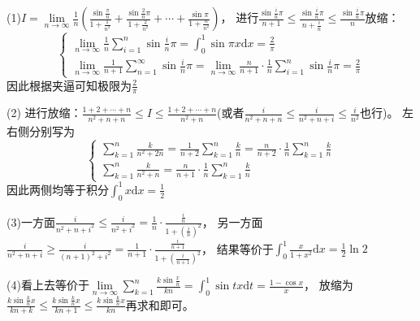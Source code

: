 \begin{solution}
  (1)$I = \lim \limits _{n \rightarrow \infty} \frac{1}{n} \left( \frac{\sin \frac{\pi}{n}}{1 + \frac{1}{n^2}} + \frac{\sin \frac{2}{n}\pi}{1 + \frac{2}{n^2}} + \cdots + \frac{\sin \pi}{1 + \frac{n}{n^2}} \right)$，
  进行$\frac{ \sin \frac{i}{n}\pi}{n+1} \leq \frac{\sin \frac{i}{n}\pi}{n + \frac{i}{n}} \leq \frac{\sin \frac{i}{n}\pi}{n}$放缩：
  \begin{equation*}
    \begin{cases}
      \lim \limits _{n \rightarrow \infty} \frac{1}{n} \sum\limits_{i = 1}^n \sin \frac{i}{n}\pi = \int_0^1 \sin \pi x \mathrm{d} x = \frac{2}{\pi}\\
     \lim \limits _{n \rightarrow \infty} \frac{1}{n+1} \sum\limits_{n = 1}^{\infty} \sin \frac{i}{n}\pi = \lim \limits _{n \rightarrow \infty}  \frac{n}{n+1} \cdot \frac{1}{n} \sum\limits_{i = 1}^n \sin \frac{i}{n}\pi = \frac{2}{\pi}
    \end{cases}
  \end{equation*}
  因此根据夹逼可知极限为$\frac{2}{\pi}$

  (2)
  进行放缩：$\frac{1+2+\cdots+n}{n^2 + n + n} \leq I \leq \frac{1 + 2 + \cdots + n}{n^2 + n}$(或者$\frac{i}{n^2 + n + n} \leq \frac{i}{n^2 + n + i} \leq \frac{i}{n^2}$也行)。
  左右侧分别写为
  \begin{equation*}
    \begin{cases}
      \sum\limits_{k = 1}^n \frac{k}{n^2 + 2n} = \frac{1}{n+2} \sum\limits_{k = 1}^n \frac{k}{n} = \frac{n}{n+2} \cdot \frac{1}{n} \sum\limits_{k = 1}^n \frac{k}{n}\\
      \sum\limits_{k = 1}^n \frac{k}{n^2 + n} = \frac{n}{n+1}\cdot \frac{1}{n} \sum\limits_{k = 1}^n \frac{k}{n}
    \end{cases}
  \end{equation*}
  因此两侧均等于积分$\int_0^1 x\mathrm{d} x = \frac{1}{2}$

  (3)一方面$\frac{i}{n^2 + n + i^2} \leq \frac{i}{n^2 + i^2} = \frac{1}{n}\cdot \frac{\frac{i}{n}}{1 + (\frac{i}{n})^2}$，
  另一方面$\frac{i}{n^2 + n + i} \geq \frac{i}{(n+1)^2 + i^2} = \frac{1}{n+1} \cdot \frac{\frac{i}{n+1}}{1 + \left( \frac{i}{n+1} \right)^2}$，
  结果等价于$\int_0^1 \frac{x}{1 + x^2}\mathrm{d} x = \frac{1}{2} \ln 2$

  (4)看上去等价于$\lim \limits _{n \rightarrow \infty} \sum\limits_{k = 1}^n \frac{k\sin \frac{x}{n}}{kn} = \int_0^1 \sin tx \mathrm{d}t = \frac{1 - \cos x}{x}$，
  放缩为$\frac{k \sin \frac{k}{n}x}{kn + k} \leq \frac{k \sin \frac{k}{n}x}{kn + 1} \leq \frac{k \sin \frac{k}{n}x}{kn}$再求和即可。
\end{solution}

